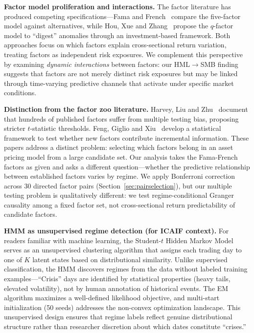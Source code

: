 \documentclass[sigconf,anonymous]{acmart}
\begin{document}
\textbf{Factor model proliferation and interactions.}
The factor literature has produced competing specifications---Fama and
French~\cite{fama2018choosing} compare the five-factor model against alternatives,
while Hou, Xue and Zhang~\cite{hou2015digesting} propose the $q$-factor model to
``digest'' anomalies through an investment-based framework. Both approaches focus on
which factors explain cross-sectional return variation, treating factors as
independent risk exposures. We complement this perspective by examining \emph{dynamic
interactions} between factors: our HML$\to$SMB finding suggests that factors are not
merely distinct risk exposures but may be linked through time-varying predictive
channels that activate under specific market conditions.

\textbf{Distinction from the factor zoo literature.}
Harvey, Liu and Zhu~\cite{harvey2016and} document that hundreds of published factors
suffer from multiple testing bias, proposing stricter $t$-statistic thresholds.
Feng, Giglio and Xiu~\cite{feng2020taming} develop a statistical framework to test
whether new factors contribute incremental information. These papers address a
distinct problem: selecting which factors belong in an asset pricing model from a
large candidate set. Our analysis takes the Fama-French factors as given and asks a
different question---whether the predictive relationship between established factors
varies by regime. We apply Bonferroni correction across 30 directed factor pairs
(Section~\ref{sec:pairselection}), but our multiple testing problem is qualitatively
different: we test regime-conditional Granger causality among a fixed factor set,
not cross-sectional return predictability of candidate factors.

\textbf{HMM as unsupervised regime detection (for ICAIF context).}
For readers familiar with machine learning, the Student-$t$ Hidden Markov Model
serves as an unsupervised clustering algorithm that assigns each trading day to
one of $K$ latent states based on distributional similarity. Unlike supervised
classification, the HMM discovers regimes from the data without labeled training
examples---``Crisis'' days are identified by statistical properties (heavy tails,
elevated volatility), not by human annotation of historical events. The EM algorithm
maximizes a well-defined likelihood objective, and multi-start initialization
(50 seeds) addresses the non-convex optimization landscape. This unsupervised
design ensures that regime labels reflect genuine distributional structure rather
than researcher discretion about which dates constitute ``crises.''
\end{document}
